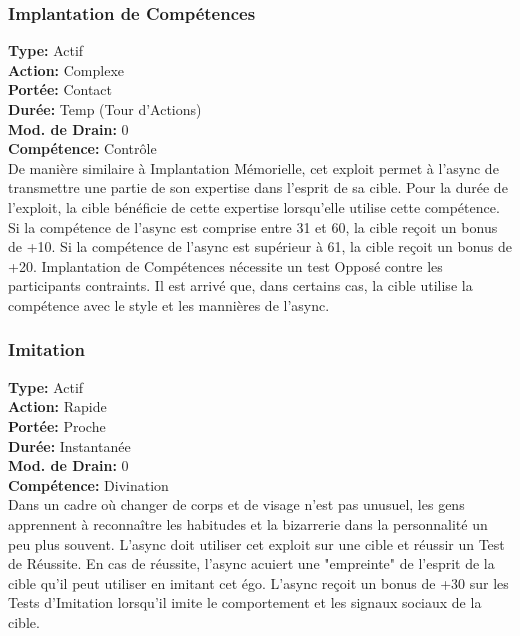\subsubsection{Implantation de Compétences} \textbf{Type:} Actif \\ \textbf{Action:} Complexe \\ \textbf{Portée:} Contact \\ \textbf{Durée:} Temp (Tour d'Actions) \\ \textbf{Mod. de Drain:} 0 \\ \textbf{Compétence:} Contrôle \\ De manière similaire à Implantation Mémorielle, cet exploit permet à l'async de transmettre une partie de son expertise dans l'esprit de sa cible. Pour la durée de l'exploit, la cible bénéficie de cette expertise lorsqu'elle utilise cette compétence. Si la compétence de l'async est comprise entre 31 et 60, la cible reçoit un bonus de +10. Si la compétence de l'async est supérieur à 61, la cible reçoit un bonus de +20. Implantation de Compétences nécessite un test Opposé contre les participants contraints. Il est arrivé que, dans certains cas, la cible utilise la compétence avec le style et les mannières de l'async. 

\subsubsection{Imitation} \textbf{Type:} Actif \\ \textbf{Action:} Rapide \\ \textbf{Portée:} Proche \\ \textbf{Durée:} Instantanée \\ \textbf{Mod. de Drain:} 0 \\ \textbf{Compétence:} Divination \\ Dans un cadre où changer de corps et de visage n'est pas unusuel, les gens apprennent à reconnaître les habitudes et la bizarrerie dans la personnalité un peu plus souvent. L'async doit utiliser cet exploit sur une cible et réussir un Test de Réussite. En cas de réussite, l'async acuiert une "empreinte" de l'esprit de la cible qu'il peut utiliser en imitant cet égo. L'async reçoit un bonus de +30 sur les Tests d'Imitation lorsqu'il imite le comportement et les signaux sociaux de la cible. 

